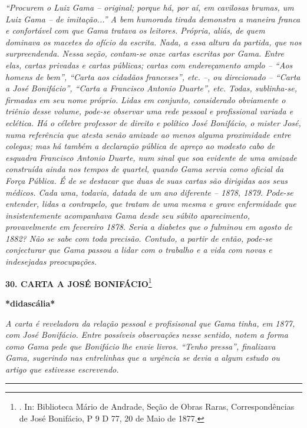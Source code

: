 \emph{``Procurem o Luiz Gama -- original; porque há, por aí, em
cavilosas brumas, um Luiz Gama -- de imitação...'' A bem humorada tirada
demonstra a maneira franca e confortável com que Gama tratava os
leitores. Própria, aliás, de quem dominava os macetes do ofício da
escrita. Nada, a essa altura da partida, que nos surpreendenda. Nessa
seção, contam-se onze cartas escritas por Gama. Entre elas, cartas
privadas e cartas públicas; cartas com endereçamento amplo --
``\emph{Aos homens de bem}'', ``\emph{Carta aos cidadãos franceses}'',
etc. --, ou direcionado -- ``\emph{Carta a José Bonifácio}'',
``\emph{Carta a Francisco Antonio Duarte}'', etc. Todas, sublinha-se,
firmadas em seu nome próprio. Lidas em conjunto, considerado obviamente
o triênio desse volume, pode-se observar uma rede pessoal e profissional
variada e eclética. Há o célebre professor de direito e político José
Bonifácio, o mister José, numa referência que atesta senão amizade ao
menos alguma proximidade entre colegas; mas há também a declaração
pública de apreço ao modesto cabo de esquadra Francisco Antonio Duarte,
num sinal que soa evidente de uma amizade construída ainda nos tempos de
quartel, quando Gama servia como oficial da Força Pública. É de se
destacar que duas de suas cartas são dirigidas aos seus médicos. Cada
uma, todavia, datada de um ano diferente -- 1878, 1879. Pode-se
entender, lidas a contrapelo, que tratam de uma mesma e grave
enfermidade que insistentemente acompanhava Gama desde seu súbito
aparecimento, provavelmente em fevereiro 1878. Seria a diabetes que o
fulminou em agosto de 1882? Não se sabe com toda precisão. Contudo, a
partir de então, pode-se conjecturar que Gama passou a lidar com o
trabalho e a vida com novas e indesejadas preocupações. }

\textbf{30. CARTA A JOSÉ BONIFÁCIO}\footnote{. In: Biblioteca Mário de
  Andrade, Seção de Obras Raras, Correspondências de José Bonifácio, P 9
  D 77, 20 de Maio de 1877.}

\textbf{*didascália*}

\emph{A carta é reveladora da relação pessoal e profisisonal que Gama
tinha, em 1877, com José Bonifácio. Entre possíveis observações nesse
sentido, notem a forma como Gama pede que Bonifácio lhe envie livros.
``Tenho pressa'', finalizava Gama, sugerindo nas entrelinhas que a
urgência se devia a algum estudo ou artigo que estivesse escrevendo. }

\begin{center}\rule{0.5\linewidth}{\linethickness}\end{center}

